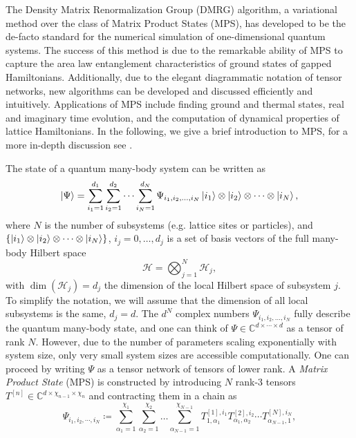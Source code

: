 The Density Matrix Renormalization Group (DMRG) algorithm, a variational method over the class of Matrix Product States (MPS), has developed to be the de-facto standard for the numerical simulation of one-dimensional quantum systems. The success of this method is due to the remarkable ability of MPS to capture the area law entanglement characteristics of ground states of gapped Hamiltonians. Additionally, due to the elegant diagrammatic notation of tensor networks, new algorithms can be developed and discussed efficiently and intuitively. Applications of MPS include finding ground and thermal states, real and imaginary time evolution, and the computation of dynamical properties of lattice Hamiltonians. In the following, we give a brief introduction to MPS, for a more in-depth discussion see \cite{cite:DMRG_in_the_age_of_MPS, cite:practical_introduction_MPS_and_PEPS, cite:tenpy}. \par
The state of a quantum many-body system can be written as
\begin{equation}
	\ket{\Psi} = \sum_{i_1=1}^{d_1} \sum_{i_2=1}^{d_2} \cdots \sum_{i_N=1}^{d_N} \Psi_{i_1,i_2,\dots,i_N} \ket{i_1} \otimes \ket{i_2} \otimes \cdots \otimes \ket{i_N},
\end{equation}
where $N$ is the number of subsystems (e.g. lattice sites or particles), and $\left\{\ket{i_1} \otimes \ket{i_2} \otimes \dots \otimes \ket{i_N}\right\}$, $i_j = 0, \dots, d_j$ is a set of basis vectors of the full many-body Hilbert space
\begin{equation}
	\mathcal{H} = \bigotimes_{j=1}^{N} \mathcal{H}_j,
\end{equation}
with $\dim\left(\mathcal{H}_j\right) = d_j$ the dimension of the local Hilbert space of subsystem $j$. To simplify the notation, we will assume that the dimension of all local subsystems is the same, $d_j = d$. The $d^N$ complex numbers $\Psi_{i_1,i_2,\dots,i_N}$ fully describe the quantum many-body state, and one can think of $\Psi\in\mathbb{C}^{d\times\cdots\times d}$ as a tensor of rank $N$. However, due to the number of parameters scaling exponentially with system size, only very small system sizes are accessible computationally. One can proceed by writing $\Psi$ as a tensor network of tensors of lower rank. A \textit{Matrix Product State} (MPS) is constructed by introducing $N$ rank-3 tensors $T^{[n]}\in\mathbb{C}^{d\times \chi_{n-1}\times \chi_{n}}$ and contracting them in a chain as
\begin{equation}
	\label{eq:MPS_open_boundary_conditions_general_definition}
	\Psi_{i_1,i_2,\cdots,i_N} \coloneqq \sum_{\alpha_1=1}^{\chi_1} \sum_{\alpha_2=1}^{\chi_2}\dots\sum_{\alpha_{N-1}=1}^{\chi_{N-1}}T^{[1],i_1}_{1,\alpha_1} T^{[2],i_2}_{\alpha_1,\alpha_2} \cdots T^{[N],i_N}_{\alpha_{N-1},1},
\end{equation}
